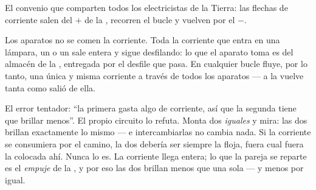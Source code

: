 \begin{omfigure}

{\small El convenio que comparten todos los electricistas de la
Tierra: las flechas de corriente salen del $+$ de la , recorren
el bucle y vuelven por el $-$.}
\end{omfigure}

\begin{proposition}\label{prop:g7:circuits-series-parallel:notconsumed}
Los aparatos no se comen la corriente. Toda la corriente que entra en
una lámpara, un  o un  sale entera y sigue
desfilando: lo que el aparato toma es \emph{} del almacén de
la , entregada por el desfile que pasa. En cualquier bucle  fluye, por lo tanto, una única y misma corriente a través de
todos los aparatos --- a la  vuelve tanta como salió de ella.
\end{proposition}

\begin{example}\label{ex:g7:circuits-series-parallel:trial}
El error tentador: ``la primera  gasta algo de corriente,
así que la segunda tiene que brillar menos''. El propio circuito lo
refuta. Monta dos  \emph{iguales}  y mira: las
dos brillan exactamente lo mismo --- e intercambiarlas no cambia nada.
Si la corriente se consumiera por el camino, la  dos
debería ser siempre la floja, fuera cual fuera la 
colocada ahí. Nunca lo es. La corriente llega entera; lo que la pareja
se reparte es el \emph{empuje} de la , y por eso las dos brillan
menos que una  sola --- y menos por igual.
\end{example}

